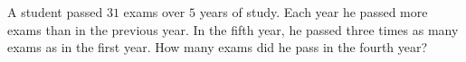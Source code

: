 A student passed $31$ exams over $5$ years of study. Each year he passed more exams than in the previous year. In the fifth year, he passed three times as many exams as in the first year. How many exams did he pass in the fourth year?
